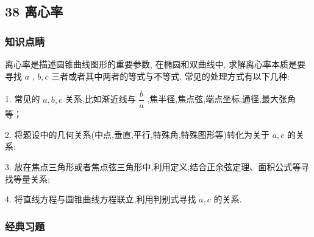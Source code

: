 \subsection*{38 离心率}

\subsubsection*{知识点睛}

离心率是描述圆锥曲线图形的重要参数, 在椭圆和双曲线中, 求解离心率本质是要寻找 $a$ , $b,c$ 三者或者其中两者的等式与不等式. 常见的处理方式有以下几种:

1. 常见的 $a,b,c$ 关系,比如渐近线与 $\dfrac{b}{a}$ ,焦半径,焦点弦,端点坐标,通径,最大张角等；

2. 将题设中的几何关系(中点,垂直,平行,特殊角,特殊图形等)转化为关于 $a,c$ 的关系;

3. 放在焦点三角形或者焦点弦三角形中,利用定义,结合正余弦定理、面积公式等寻找等量关系;

4. 将直线方程与圆锥曲线方程联立,利用判别式寻找 $a,c$ 的关系.

\subsubsection*{经典习题}

